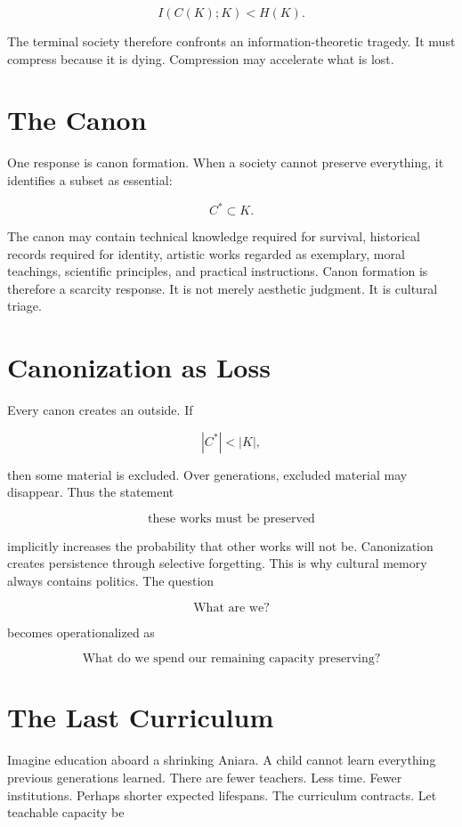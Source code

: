 \documentclass[11pt,oneside]{book}
\theoremstyle{definition}
\theoremstyle{remark}
\begin{document}
\[
I(C(K);K)<H(K).
\]

The terminal society therefore confronts an information-theoretic tragedy. It must compress because
it is dying. Compression may accelerate what is lost.

\section{The Canon}

One response is canon formation. When a society cannot preserve everything, it identifies a subset
as essential:

\[
C^\ast\subset K.
\]

The canon may contain technical knowledge required for survival, historical records required for
identity, artistic works regarded as exemplary, moral teachings, scientific principles, and
practical instructions. Canon formation is therefore a scarcity response. It is not merely aesthetic
judgment. It is cultural triage.

\section{Canonization as Loss}

Every canon creates an outside. If

\[
|C^\ast|<|K|,
\]

then some material is excluded. Over generations, excluded material may disappear. Thus the
statement

\[
\text{these works must be preserved}
\]

implicitly increases the probability that other works will not be. Canonization creates persistence
through selective forgetting. This is why cultural memory always contains politics. The question

\[
\text{What are we?}
\]

becomes operationalized as

\[
\text{What do we spend our remaining capacity preserving?}
\]

\section{The Last Curriculum}

Imagine education aboard a shrinking Aniara. A child cannot learn everything previous generations
learned. There are fewer teachers. Less time. Fewer institutions. Perhaps shorter expected
lifespans. The curriculum contracts. Let teachable capacity be
\end{document}
